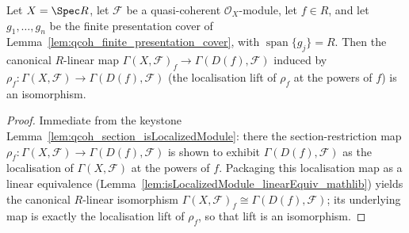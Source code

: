 \begin{lemma}
  \label{lem:qcoh_section_kernel_comparison}
  Let \(X = \Spec R\), let \(\mathcal{F}\) be a quasi-coherent \(\mathcal{O}_X\)-module, let \(f \in R\),
  and let \(g_1, \ldots, g_n\) be the finite presentation cover of
  Lemma~\ref{lem:qcoh_finite_presentation_cover}, with \(\operatorname{span}\{g_j\} = R\). Then the
  canonical \(R\)-linear map \(\Gamma(X, \mathcal{F})_f \to \Gamma(D(f), \mathcal{F})\) induced by
  \(\rho_f : \Gamma(X, \mathcal{F}) \to \Gamma(D(f), \mathcal{F})\) (the localisation lift of \(\rho_f\)
  at the powers of \(f\)) is an isomorphism.
\end{lemma}
\begin{proof}
    \leanok
  Immediate from the keystone Lemma~\ref{lem:qcoh_section_isLocalizedModule}: there the
  section-restriction map \(\rho_f : \Gamma(X, \mathcal{F}) \to \Gamma(D(f), \mathcal{F})\) is shown to
  exhibit \(\Gamma(D(f), \mathcal{F})\) as the localisation of \(\Gamma(X, \mathcal{F})\) at the powers of
  \(f\). Packaging this localisation map as a linear equivalence
  (Lemma~\ref{lem:isLocalizedModule_linearEquiv_mathlib})
  yields the canonical \(R\)-linear isomorphism \(\Gamma(X, \mathcal{F})_f \cong \Gamma(D(f),
  \mathcal{F})\); its underlying map is exactly the localisation lift of \(\rho_f\), so that lift is an
  isomorphism.
\end{proof}

